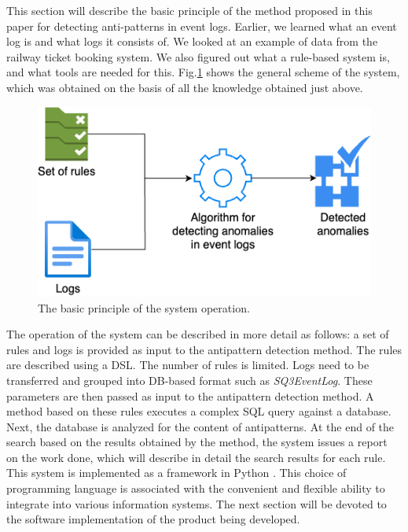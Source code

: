 \documentclass[12pt, times]{article}
\begin{document}
	\hspace*{5mm}This section will describe the basic principle of the method proposed in this paper for detecting anti-patterns in event logs.  Earlier, we learned what an event log is and what logs it consists of. We looked at an example of data from the railway ticket booking system. We also figured out what a rule-based system is, and what tools are needed for this. Fig.\ref{fig:scheme} shows the general scheme of the system, which was obtained on the basis of all the knowledge obtained just above.
	
	\begin{figure}[h]
		\centering
		\includegraphics[scale=0.7]{scheme}
		\caption{The basic principle of the system operation.}
		\label{fig:scheme}
	\end{figure}
	
	\hspace*{5mm}The operation of the system can be described in more detail as follows: a set of rules and logs is provided as input to the antipattern detection method. The rules are described using a DSL. The number of rules is limited. Logs need to be transferred and grouped into DB-based format such as \textit{SQ3EventLog}. These parameters are then passed as input to the antipattern detection method. A method based on these rules executes a complex SQL query against a database. Next, the database is analyzed for the content of antipatterns. At the end of the search based on the results obtained by the method, the system issues a report on the work done, which will describe in detail the search results for each rule. \\
	\hspace*{5mm}This system is implemented as a framework in Python \cite{python}. This choice of programming language is associated with the convenient and flexible ability to integrate into various information systems. The next section will be devoted to the software implementation of the product being developed.
	
\end{document}
